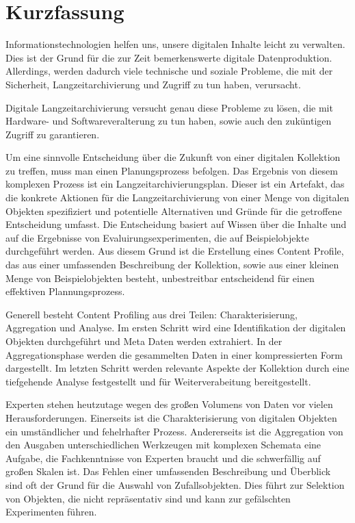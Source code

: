 \chapter*{Kurzfassung}
\vspace{-1cm}
Informationstechnologien helfen uns, unsere digitalen Inhalte leicht zu verwalten.
Dies ist der Grund f\"{u}r die zur Zeit bemerkenswerte digitale Datenproduktion.
Allerdings, werden dadurch viele technische und soziale Probleme, die mit der Sicherheit, Langzeitarchivierung und Zugriff zu tun haben, verursacht.

Digitale Langzeitarchivierung versucht genau diese Probleme zu l\"{o}sen, die mit Hardware- und Softwareveralterung zu tun haben, sowie auch den zuk\"{u}ntigen Zugriff zu garantieren.

Um eine sinnvolle Entscheidung \"{u}ber die Zukunft von einer digitalen Kollektion zu treffen, muss man einen Planungsprozess befolgen.
Das Ergebnis von diesem komplexen Prozess ist ein Langzeitarchivierungsplan.
Dieser ist ein Artefakt, das die konkrete Aktionen f\"{u}r die Langzeitarchivierung von einer Menge von digitalen Objekten spezifiziert und potentielle Alternativen und Gr\"{u}nde f\"{u}r die getroffene Entscheidung umfasst.
Die Entscheidung basiert auf Wissen \"{u}ber die Inhalte und auf die Ergebnisse von Evaluirungsexperimenten, die auf Beispielobjekte durchgef\"{u}hrt werden.
Aus diesem Grund ist die Erstellung eines Content Profile, das aus einer umfassenden Beschreibung der Kollektion, sowie aus einer kleinen Menge von Beispielobjekten besteht, unbestreitbar entscheidend f\"{u}r einen effektiven Plannungsprozess.

Generell besteht Content Profiling aus drei Teilen: Charakterisierung, Aggregation und Analyse.
Im ersten Schritt wird eine Identifikation der digitalen Objekten durchgef\"{u}hrt und Meta Daten werden extrahiert.
In der Aggregationsphase werden die gesammelten Daten in einer kompressierten Form dargestellt.
Im letzten Schritt werden relevante Aspekte der Kollektion durch eine tiefgehende Analyse festgestellt und f\"{u}r Weiterverabeitung bereitgestellt. 

Experten stehen heutzutage wegen des gro{\ss}en Volumens von Daten vor vielen Herausforderungen. Einerseits ist die Charakterisierung von digitalen Objekten ein umst\"{a}ndlicher und fehelrhafter Prozess. Andererseits ist die Aggregation von den Ausgaben unterschiedlichen Werkzeugen mit komplexen Schemata eine Aufgabe, die Fachkenntnisse von Experten braucht und die schwerf\"{a}llig auf gro{\ss}en Skalen ist.
Das Fehlen einer umfassenden Beschreibung und \"{U}berblick sind oft der Grund f\"{u}r die Auswahl von Zufallsobjekten. Dies f\"{u}hrt zur Selektion von Objekten, die nicht repr\"{a}sentativ sind und kann zur gef\"{a}lschten Experimenten f\"{u}hren.


